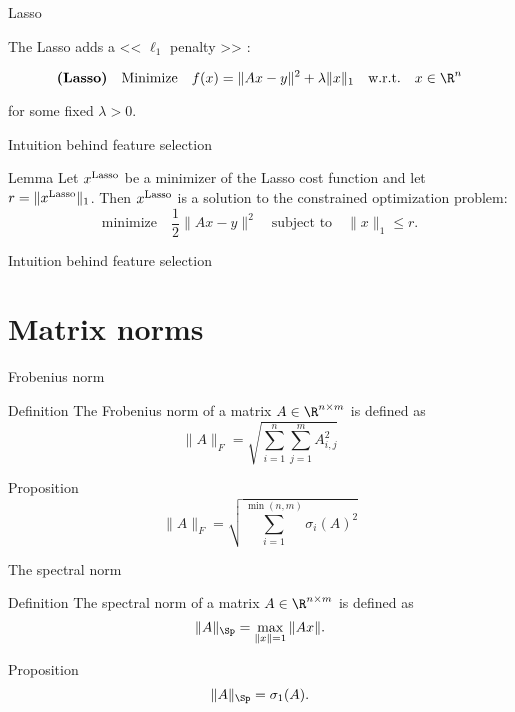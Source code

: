 \documentclass{beamer}
\begin{document}
\begin{frame}[t]{Lasso}
	\grid

	\vspace{-0.1cm}
	The Lasso adds a << $\ell_1$ penalty >> :
	\vspace{-0.3cm}
	\begin{exampleblock}
		$$
		\textbf{(Lasso)} \quad \text{Minimize} \quad f(x) = \| Ax - y \|^2 + \lambda \|x\|_1 \quad \text{w.r.t.} \quad x \in \R^n
		$$
	\end{exampleblock}
	for some fixed $\lambda > 0$.

\end{frame}

\begin{frame}[t]{Intuition behind feature selection}
	\grid

	\vspace{-0.4cm}
	\begin{block}{Lemma}
	Let $x^{\rm Lasso}$ be a minimizer of the Lasso cost function and let $r=\|x^{\rm Lasso}\|_1$. Then $x^{\rm Lasso}$ is a solution to the constrained optimization problem:
	$$
	\text{minimize} \quad \frac{1}{2} \|Ax-y\|^2 \quad
	\text{subject to} \quad \|x\|_1 \leq r.
	$$
\end{block}

\end{frame}

\begin{frame}[t]{Intuition behind feature selection}
	\grid

\end{frame}


\section{Matrix norms}

\begin{frame}[t]{Frobenius norm}
	\grid

	\begin{block}{Definition}
		The Frobenius norm of a matrix $A \in \R^{n \times m}$ is defined as
		$$
		\|A\|_F = \sqrt{\sum_{i=1}^n \sum_{j=1}^m A_{i,j}^2}
		$$
	\end{block}
	\begin{block}{Proposition}
		$$
		\|A\|_F = \sqrt{\sum_{i=1}^{\min(n,m)} \sigma_i(A)^2}
		$$
	\end{block}
\end{frame}
\begin{frame}[t]{The spectral norm}
	\grid

	\vspace{-0.4cm}
	\begin{block}{Definition}
		The spectral norm of a matrix $A \in \R^{n \times m}$ is defined as
		$$
		\|A\|_{\Sp} = \max_{\|x\| = 1}	\|Ax\|.
	\vspace{-0.3cm}
		$$
	\end{block}
	\begin{block}{Proposition}
	\vspace{-0.3cm}
		$$
		\|A\|_{\Sp} = \sigma_1(A).
		$$
	\end{block}
\end{frame}
\end{document}
